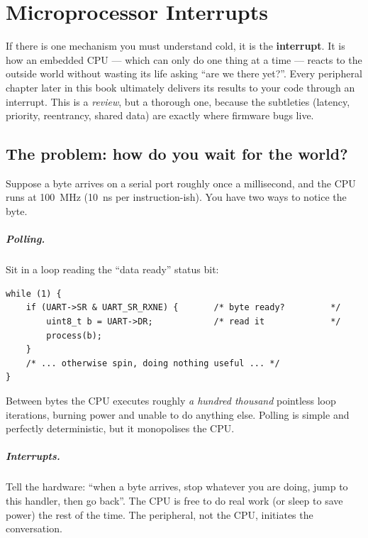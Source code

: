 \documentclass[11pt,a4paper,oneside]{book}
\begin{document}
\chapter{Microprocessor Interrupts}
\label{ch:interrupts}

If there is one mechanism you must understand cold, it is the \textbf{interrupt}.
It is how an embedded CPU --- which can only do one thing at a time --- reacts
to the outside world without wasting its life asking ``are we there yet?''.
Every peripheral chapter later in this book ultimately delivers its results to
your code through an interrupt. This is a \emph{review}, but a thorough one,
because the subtleties (latency, priority, reentrancy, shared data) are exactly
where firmware bugs live.

\section{The problem: how do you wait for the world?}

Suppose a byte arrives on a serial port roughly once a millisecond, and the CPU
runs at \qty{100}{\mega\hertz} (\qty{10}{\nano\second} per instruction-ish).
You have two ways to notice the byte.

\paragraph{Polling.} Sit in a loop reading the ``data ready'' status bit:
\begin{lstlisting}
while (1) {
    if (UART->SR & UART_SR_RXNE) {       /* byte ready?         */
        uint8_t b = UART->DR;            /* read it             */
        process(b);
    }
    /* ... otherwise spin, doing nothing useful ... */
}
\end{lstlisting}
Between bytes the CPU executes roughly \emph{a hundred thousand} pointless
loop iterations, burning power and unable to do anything else. Polling is
simple and perfectly deterministic, but it monopolises the CPU.

\paragraph{Interrupts.} Tell the hardware: ``when a byte arrives, stop whatever
you are doing, jump to this handler, then go back''. The CPU is free to do real
work (or sleep to save power) the rest of the time. The peripheral, not the CPU,
initiates the conversation.
\end{document}

